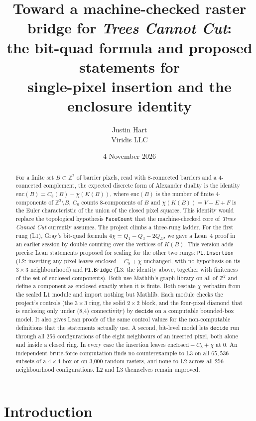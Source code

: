 \documentclass[11pt]{article}
\title{Toward a machine-checked raster bridge for \emph{Trees Cannot Cut}:\\
the bit-quad formula and proposed statements for\\
single-pixel insertion and the enclosure identity}
\author{Justin Hart\\Viridis LLC}
\date{4 November 2026}
\theoremstyle{definition}
\theoremstyle{remark}
\begin{document}
\maketitle

\begin{abstract}
For a finite set $B\subset\mathbb{Z}^2$ of barrier pixels, read with
8-connected barriers and a 4-connected complement, the expected discrete form of
Alexander duality is the identity
$\mathrm{enc}(B) = C_8(B)-\chi(K(B))$, where $\mathrm{enc}(B)$ is the number
of finite 4-components of $\mathbb{Z}^2\setminus B$, $C_8$ counts 8-components of $B$ and $\chi(K(B))=V-E+F$ is the Euler
characteristic of the union of the closed pixel squares. This identity would
replace the topological hypothesis \texttt{FaceCount} that the machine-checked
core of \emph{Trees Cannot Cut} currently assumes. The project climbs a
three-rung ladder. For the first rung (L1), Gray's bit-quad formula
$4\chi = Q_1-Q_3-2Q_D$, we gave a Lean~4 proof in an earlier session by
double counting over the vertices of $K(B)$. This version adds precise Lean
statements proposed for sealing for the other two rungs: \texttt{P1.Insertion}
(L2: inserting any pixel leaves $\text{enclosed}-C_8+\chi$ unchanged, with no
hypothesis on its $3\times3$ neighbourhood) and \texttt{P1.Bridge} (L3: the
identity above, together with finiteness of the set of enclosed components).
Both use Mathlib's graph library on all of $\mathbb{Z}^2$ and define a component
as enclosed exactly when it is finite. Both restate $\chi$ verbatim from the sealed L1
module and import nothing but Mathlib. Each module checks the project's controls (the $3\times3$ ring, the
solid $2\times2$ block, and the four-pixel diamond that is enclosing only under
(8,4) connectivity) by \texttt{decide} on a computable bounded-box model. It also
gives Lean proofs of the same control values for the non-computable definitions
that the statements actually use. A second, bit-level model lets \texttt{decide}
run through all 256 configurations of the eight neighbours of an inserted pixel,
both alone and inside a closed ring. In every case the insertion leaves
$\text{enclosed}-C_8+\chi$ at $0$. An independent brute-force computation finds
no counterexample to L3 on all $65{,}536$ subsets of a $4\times4$ box or on
3{,}000 random rasters, and none to L2 across all 256 neighbourhood
configurations. L2 and L3 themselves remain unproved.
\end{abstract}

\section{Introduction}
\end{document}
